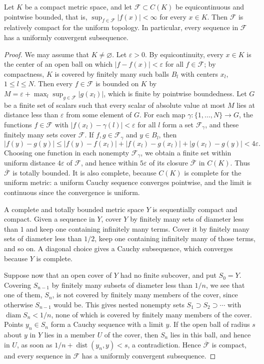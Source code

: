\begin{proposition}\label{prop:arzela-ascoli}
Let $K$ be a compact metric space, and let $\mathcal F\subset C(K)$ be equicontinuous and pointwise bounded, that is, $\sup_{f\in\mathcal F}|f(x)|<\infty$ for every $x\in K$. Then $\mathcal F$ is relatively compact for the uniform topology. In particular, every sequence in $\mathcal F$ has a uniformly convergent subsequence.
\end{proposition}
\begin{proof}
We may assume that $K\neq\varnothing$. Let $\varepsilon>0$. By equicontinuity, every $x\in K$ is the center of an open ball on which $|f-f(x)|<\varepsilon$ for all $f\in\mathcal F$; by compactness, $K$ is covered by finitely many such balls $B_l$ with centers $x_l$, $1\leq l\leq N$. Then every $f\in\mathcal F$ is bounded on $K$ by $M=\varepsilon+\max_l\sup_{g\in\mathcal F}|g(x_l)|$, which is finite by pointwise boundedness. Let $G$ be a finite set of scalars such that every scalar of absolute value at most $M$ lies at distance less than $\varepsilon$ from some element of $G$. For each map $\gamma\colon\{1,\ldots,N\}\to G$, the functions $f\in\mathcal F$ with $|f(x_l)-\gamma(l)|<\varepsilon$ for all $l$ form a set $\mathcal F_\gamma$, and these finitely many sets cover $\mathcal F$. If $f,g\in\mathcal F_\gamma$ and $y\in B_l$, then
\[
 |f(y)-g(y)|\leq|f(y)-f(x_l)|+|f(x_l)-g(x_l)|+|g(x_l)-g(y)|<4\varepsilon.
\]
Choosing one function in each nonempty $\mathcal F_\gamma$, we obtain a finite set within uniform distance $4\varepsilon$ of $\mathcal F$, and hence within $5\varepsilon$ of its closure $\overline{\mathcal F}$ in $C(K)$. Thus $\overline{\mathcal F}$ is totally bounded. It is also complete, because $C(K)$ is complete for the uniform metric: a uniform Cauchy sequence converges pointwise, and the limit is continuous since the convergence is uniform.

A complete and totally bounded metric space $Y$ is sequentially compact and compact. Given a sequence in $Y$, cover $Y$ by finitely many sets of diameter less than $1$ and keep one containing infinitely many terms. Cover it by finitely many sets of diameter less than $1/2$, keep one containing infinitely many of those terms, and so on. A diagonal choice gives a Cauchy subsequence, which converges because $Y$ is complete.

Suppose now that an open cover of $Y$ had no finite subcover, and put $S_0=Y$. Covering $S_{n-1}$ by finitely many subsets of diameter less than $1/n$, we see that one of them, $S_n$, is not covered by finitely many members of the cover, since otherwise $S_{n-1}$ would be. This gives nested nonempty sets $S_1\supset S_2\supset\cdots$ with $\operatorname{diam}S_n<1/n$, none of which is covered by finitely many members of the cover. Points $y_n\in S_n$ form a Cauchy sequence with a limit $y$. If the open ball of radius $s$ about $y$ in $Y$ lies in a member $U$ of the cover, then $S_n$ lies in this ball, and hence in $U$, as soon as $1/n+\operatorname{dist}(y_n,y)<s$, a contradiction. Hence $\overline{\mathcal F}$ is compact, and every sequence in $\mathcal F$ has a uniformly convergent subsequence.
\end{proof}

